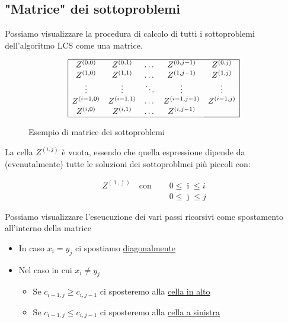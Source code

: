 \newpage
\subsection{"Matrice" dei sottoproblemi}
Possiamo visualizzare la procedura di calcolo di tutti i sottoproblemi dell'algoritmo LCS come una matrice. 

\begin{figure}[h]
    {\Large \[
    \begin{array}{|ccccc|}
    \hline
    Z^{(0,0)} & Z^{(0,1)} & \dots & Z^{(0,j-1)} & Z^{(0,j)} \\
    Z^{(1,0)} & Z^{(1,1)} & \dots & Z^{(1,j-1)} & Z^{(1,j)} \\
    \vdots & \vdots & \ddots & \vdots & \vdots \\
    Z^{(i-1,0)} & Z^{(i-1,1)} & \dots & Z^{(i-1,j-1)} & Z^{(i-1,j)} \\
    Z^{(i,0)} & Z^{(i,1)} & \dots & Z^{(i,j-1)} & \multicolumn{1}{c|}{} \\ \cline{5-5}
    \hline
    \end{array}
    \]}

    \caption{Esempio di matrice dei sottoproblemi}
\end{figure}

La cella $Z^{(i,j)}$ è vuota, essendo che quella espressione dipende da (evenutalmente) tutte le soluzioni dei sottoproblmei più piccoli con:
{
    \large

    \begin{align*}
        Z^{(\bar{\imath}, \bar{\jmath})} \quad \text{con } & \quad 0 \leq \bar{\imath} \leq i \\
        & \quad 0 \leq \bar{\jmath} \leq j
    \end{align*}

}

Possiamo visualizzare l'eseucuzione dei vari passi ricorsivi come spostamento all'interno della matrice

\begin{itemize}
    \item In caso $x_i = y_j$ ci spostiamo \uline{diagonalmente}
    \item Nel caso in cui $x_i \not = y_j$
        \begin{itemize}
            \item [\textbf{(a)}] Se $c_{i-1,j} \geq c_{i,j-1}$ ci sposteremo alla \uline{cella in alto}
            \item [\textbf{(b)}] Se $c_{i-1,j} \leq c_{i,j-1}$ ci sposteremo alla \uline{cella a sinistra}
        \end{itemize}
\end{itemize}

